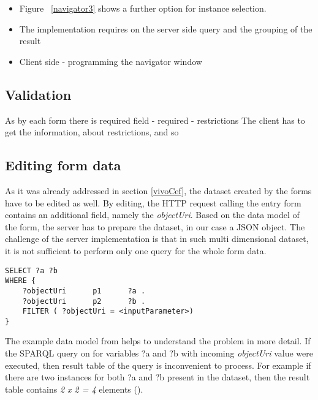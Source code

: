 \begin{itemize}
	\item Figure ~\ref{navigator3} shows a further option for instance selection. 
\end{itemize}


\begin{itemize}
	\item The implementation requires on the server side query and the grouping of the result
	\item Client side - programming the navigator window
\end{itemize}


\subsection{Validation}

As by each form there is required field - required - restrictions
The client has to get the information, about restrictions, and so  


\subsection{Editing form data}
	
As it was already addressed in section \ref{vivoCef}, the dataset created by the forms have to be edited as well. By editing, the HTTP request calling the entry form contains an additional field, namely the \textit{objectUri}. Based on the data model of the form, the server has to prepare the dataset, in our case a JSON object. The challenge of the server implementation is that in such multi dimensional dataset, it is not sufficient to perform only one query for the whole form data.


\begin{lstlisting}[captionpos=b, caption=SPARQL query for the form data, label={sparqlExisting},
basicstyle=\footnotesize,frame=single]
SELECT ?a ?b
WHERE {
	?objectUri		p1		?a .
	?objectUri		p2		?b .
	FILTER ( ?objectUri = <inputParameter>)
}
\end{lstlisting}

The example data model from  helps to understand the problem in more detail. If the SPARQL query on  for variables ?a and ?b with incoming \textit{objectUri} value were executed, then result table of the query is inconvenient to process. For example if there are two instances for both ?a and ?b present in the dataset, then the result table contains \textit{2 x 2 = 4} elements ().

